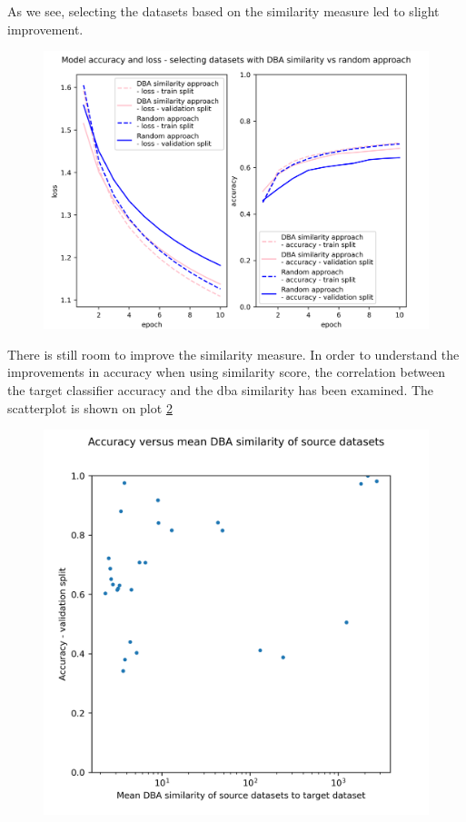 \documentclass[a4paper,11pt,twoside]{report}
\theoremstyle{definition}
\begin{document}
As we see, selecting the datasets based on the similarity measure led to slight improvement.
\FloatBarrier
\begin{figure}[h!t]
\centering
\includegraphics[width=17cm]{imgs/dba_vs_random/loss_acc.png}
\caption{}
\label{fig:random_vs_dba}
\end{figure}
\FloatBarrier
There is still room to improve the similarity measure. In order to understand the improvements in accuracy when using similarity score, the correlation between the target classifier accuracy and the dba similarity has been examined. The scatterplot is shown on plot \ref{fig:acc_vs_dba_sim}
\FloatBarrier
\begin{figure}[h!t]
\centering
\includegraphics[width=17cm]{imgs/ensemble/accuracy_vs_mean_dba_sim.png}
\caption{}
\label{fig:acc_vs_dba_sim}
\end{figure}
\FloatBarrier
\end{document}
